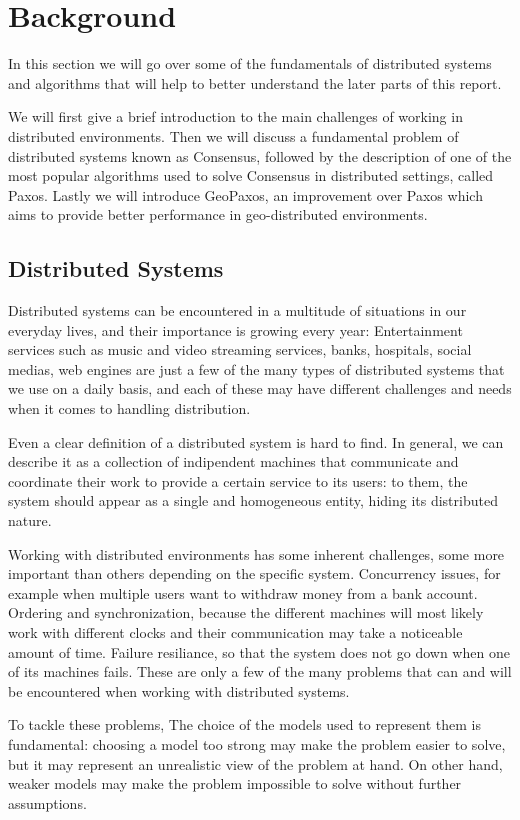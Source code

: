 \chapter{Background}\label{sec:Background}
In this section we will go over some of the fundamentals of distributed systems and algorithms that will help to better understand the later parts of this report.

We will first give a brief introduction to the main challenges of working in distributed environments. Then we will discuss a fundamental problem of distributed systems known as Consensus, followed by the description of one of the most popular algorithms used to solve Consensus in distributed settings, called Paxos. Lastly we will introduce GeoPaxos, an improvement over Paxos which aims to provide better performance in geo-distributed environments.

\section{Distributed Systems}\label{sec:Distributed Systems}
Distributed systems can be encountered in a multitude of situations in our everyday lives, and their importance is growing every year: Entertainment services such as music and video streaming services, banks, hospitals, social medias, web engines are just a few of the many types of distributed systems that we use on a daily basis, and each of these may have different challenges and needs when it comes to handling distribution.

Even a clear definition of a distributed system is hard to find. In general, we can describe it as a collection of indipendent machines that communicate and coordinate their work to provide a certain service to its users: to them, the system should appear as a single and homogeneous entity, hiding its distributed nature.

Working with distributed environments has some inherent challenges, some more important than others depending on the specific system. Concurrency issues, for example when multiple users want to withdraw money from a bank account. Ordering and synchronization, because the different machines will most likely work with different clocks and their communication may take a noticeable amount of time. Failure resiliance, so that the system does not go down when one of its machines fails. These are only a few of the many problems that can and will be encountered when working with distributed systems.

To tackle these problems, The choice of the models used to represent them is fundamental: choosing a model too strong may make the problem easier to solve, but it may represent an unrealistic view of the problem at hand. On other hand, weaker models may make the problem impossible to solve without further assumptions. 

